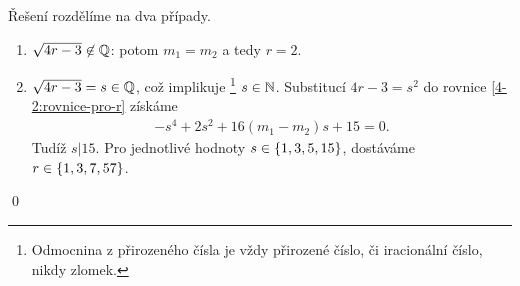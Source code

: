 Řešení rozdělíme na dva případy.
\begin{enumerate}
\item $\sqrt{4r-3} \not\in \mathbb{Q}$: potom $m_1 = m_2$ a tedy $r = 2$.
\item $\sqrt{4r-3} = s \in \mathbb{Q}$, což implikuje
\footnote{Odmocnina z přirozeného čísla je vždy přirozené číslo, či iracionální číslo, nikdy zlomek.} 
 $s \in \mathbb{N}$.
  Substitucí $4r - 3 = s^2$ do rovnice \ref{4-2:rovnice-pro-r} získáme
  \begin{align}
  -s^4 + 2s^2 + 16(m_1 - m_2)s +15 =0.
  \end{align}
  Tudíž $s|15$. Pro jednotlivé hodnoty	$s \in \left\{1, 3, 5, 15\right\}$, dostáváme $r \in \left\{1, 3, 7, 57\right\}$.
\end{enumerate}
\qed
